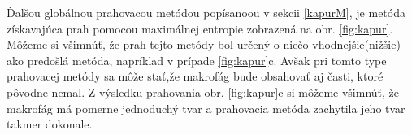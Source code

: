 \documentclass[a4paper,11pt,oneside]{article}%
\begin{document}
Ďalšou globálnou prahovacou metódou popísanoou v sekcii \ref{kapurM}, je metóda získavajúca prah pomocou maximálnej entropie zobrazená na obr. \ref{fig:kapur}. Môžeme si všimnúť, že prah tejto metódy bol určený o niečo vhodnejšie(nižšie) ako predošlá metóda, napríklad v prípade \ref{fig:kapur}c. Avšak pri tomto type prahovacej metódy sa môže stať,že makrofág bude obsahovať aj časti, ktoré pôvodne nemal. Z výsledku prahovania obr. \ref{fig:kapur}c si môžeme všimnúť, že makrofág má pomerne jednoduchý tvar a prahovacia metóda zachytila jeho tvar takmer dokonale.  

\begin{figure}[H]  
    \hspace{5px}

\end{figure}
\end{document}
